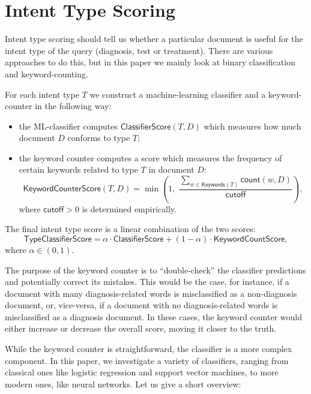 \section{Intent Type Scoring}\label{intent-scoring}
Intent type scoring should tell us whether a particular document is useful for the intent type of the query 
(diagnosis, test or treatment). There are various approaches to do this, but in this paper we mainly look at
binary classification and keyword-counting.

For each intent type $T$ we construct a machine-learning classifier and a keyword-counter in the following way:
\begin{itemize}
 \item the ML-classifier computes $\textsf{ClassifierScore}(T,D)$ which measures how much document $D$ conforms to type $T$;
 \item the keyword counter computes a score which measures the frequency of certain keywords related to type $T$ in document $D$:
 \begin{equation}\label{basic-formula}
  \textsf{KeywordCounterScore}(T,D) = \min\left(1,\,\, \displaystyle\frac{\displaystyle\sum_{w\in \textsf{Keywords}(T)} \textsf{count}(w,D)}{\textsf{cutoff}}\right),
 \end{equation}
  where $\textsf{cutoff} > 0$ is determined empirically.
\end{itemize}

The final intent type score is a linear combination of the two scores:
\begin{equation}\label{clf-combine-formula}
 \textsf{TypeClassifierScore} = \alpha\cdot\textsf{ClassifierScore} + (1-\alpha)\cdot\textsf{KeywordCountScore},
\end{equation}
where $\alpha\in (0,1)$.

The purpose of the keyword counter is to ``double-check'' the classifier predictions and potentially correct its mistakes.
This would be the case, for instance,
if a document with many diagnosis-related words is misclassified as a non-diagnosis document,
or, vice-versa, if a document with no diagnosis-related words is misclassified as a diagnosis document.
In these cases, the keyword counter would either increase or decrease the overall score, moving it closer to the truth.


While the keyword counter is straightforward, the classifier is a more complex component. In this paper, we investigate 
a variety of classifiers, ranging from classical ones like logistic regression and support vector machines, to more modern
ones, like neural networks. Let us give a short overview:

